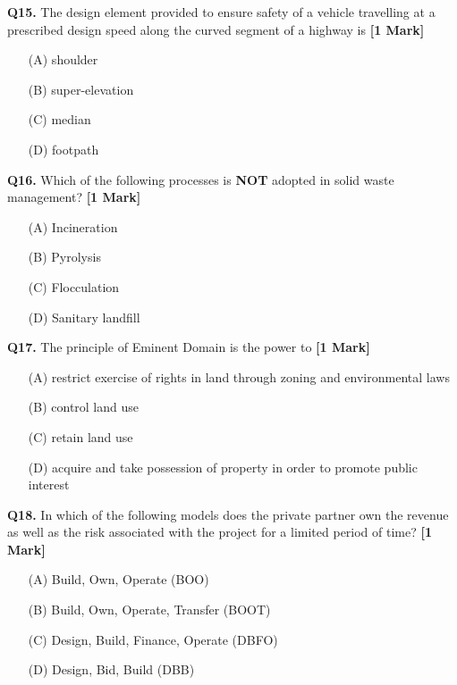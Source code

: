 \documentclass[11pt]{article}
\newcommand{\questiona}[2]{
    \noindent\textbf{Q#2.} #1 \hfill \textbf{[1 Mark]}
}
\begin{document}
\vspace{0.5cm}

\questiona{The design element provided to ensure safety of a vehicle travelling at a prescribed design speed along the curved segment of a highway is}{15}
\begin{enumerate}
    \item[(A)] shoulder
    \item[(B)] super-elevation  
    \item[(C)] median
    \item[(D)] footpath
\end{enumerate}

\vspace{0.5cm}

\questiona{Which of the following processes is \textbf{NOT} adopted in solid waste management?}{16}
\begin{enumerate}
    \item[(A)] Incineration
    \item[(B)] Pyrolysis  
    \item[(C)] Flocculation
    \item[(D)] Sanitary landfill
\end{enumerate}

\vspace{0.5cm}

\questiona{The principle of Eminent Domain is the power to}{17}
\begin{enumerate}
    \item[(A)] restrict exercise of rights in land through zoning and environmental laws
    \item[(B)] control land use  
    \item[(C)] retain land use
    \item[(D)] acquire and take possession of property in order to promote public interest
\end{enumerate}

\vspace{0.5cm}

\questiona{In which of the following models does the private partner own the revenue as well as the risk associated with the project for a limited period of time?}{18}
\begin{enumerate}
    \item[(A)] Build, Own, Operate (BOO)  
    \item[(B)] Build, Own, Operate, Transfer (BOOT)  
    \item[(C)] Design, Build, Finance, Operate (DBFO)
    \item[(D)] Design, Bid, Build (DBB)
\end{enumerate}
\end{document}

